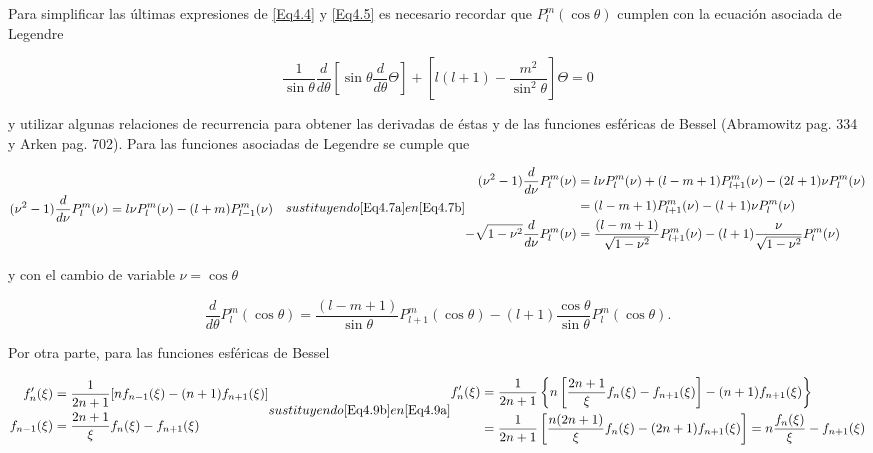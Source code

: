 \documentclass[a4paper,10pt]{article}
\begin{document}
Para simplificar las últimas expresiones de \eqref{Eq4.4} y \eqref{Eq4.5} es necesario recordar que $P_l^m(\cos\theta)$ cumplen con la ecuación asociada de Legendre

\begin{equation}
\frac{1}{\sin\theta}\frac{d}{d\theta}\left[\sin\theta\frac{d}{d\theta}\Theta\right]+\left[l(l+1)-\frac{m^2}{\sin^2\theta}\right]\Theta=0
\label{Eq4.6}
\end{equation}

y utilizar algunas relaciones de recurrencia para obtener las derivadas de éstas y de las funciones esféricas de Bessel (Abramowitz pag. 334 y Arken pag. 702). Para las funciones asociadas de Legendre se cumple que

\begin{subequations}
\begin{align}
(\nu^2-1)\frac{d}{d\nu}P_l^m(\nu)	&=l\nu P_l^m(\nu)-(l+m)P_{l-1}^m(\nu)	\label{Eq4.7b}
\end{align}

sustituyendo \eqref{Eq4.7a} en \eqref{Eq4.7b}

\begin{align}
(\nu^2-1)\frac{d}{d\nu}P_l^m(\nu)	&=l\nu P_l^m(\nu)+(l-m+1)P_{l+1}^m(\nu)-(2l+1)\nu P_l^m(\nu)	\\
&=(l-m+1)P_{l+1}^m(\nu)-(l+1)\nu P_l^m(\nu)	\\
-\sqrt{1-\nu^2}\frac{d}{d\nu}P_l^m(\nu)	&=\frac{(l-m+1)}{\sqrt{1-\nu^2}}P_{l+1}^m(\nu)-(l+1)\frac{\nu}{\sqrt{1-\nu^2}}P_l^m(\nu)
\end{align}
\end{subequations}

y con el cambio de variable $\nu=\cos\theta$

\begin{equation}
\frac{d}{d\theta}P_l^m(\cos\theta)=\frac{(l-m+1)}{\sin\theta}P_{l+1}^m(\cos\theta)-(l+1)\frac{\cos\theta}{\sin\theta}P_l^m(\cos\theta).
\label{Eq4.8}
\end{equation}

Por otra parte, para las funciones esféricas de Bessel

\begin{subequations}
\begin{align}
f'_n(\xi)	&=\frac{1}{2n+1}[nf_{n-1}(\xi)-(n+1)f_{n+1}(\xi)]	\label{Eq4.9a}	\\
f_{n-1}(\xi)	&=\frac{2n+1}{\xi}f_n(\xi)-f_{n+1}(\xi)	\label{Eq4.9b}
\end{align}

sustituyendo \eqref{Eq4.9b} en \eqref{Eq4.9a}

\begin{align}
f'_n(\xi)
&=\frac{1}{2n+1}\left\{n\left[\frac{2n+1}{\xi}f_n(\xi)-f_{n+1}(\xi)\right]-(n+1)f_{n+1}(\xi)\right\}	\\
&=\frac{1}{2n+1}\left[\frac{n(2n+1)}{\xi}f_n(\xi)-(2n+1)f_{n+1}(\xi)\right]=n\frac{f_n(\xi)}{\xi}-f_{n+1}(\xi)
\end{align}
\end{subequations}
\end{document}
